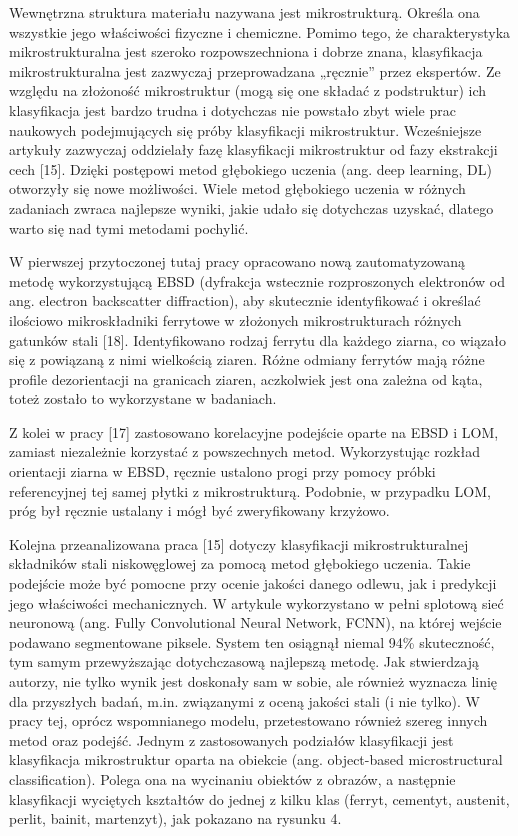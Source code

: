Wewnętrzna struktura materiału nazywana jest mikrostrukturą. Określa ona wszystkie jego właściwości fizyczne i chemiczne. Pomimo tego, że charakterystyka mikrostrukturalna jest szeroko rozpowszechniona i dobrze znana, klasyfikacja mikrostrukturalna jest zazwyczaj przeprowadzana „ręcznie” przez ekspertów. Ze względu na złożoność mikrostruktur (mogą się one składać z podstruktur) ich klasyfikacja jest bardzo trudna i dotychczas nie powstało zbyt wiele prac naukowych podejmujących się próby klasyfikacji mikrostruktur. Wcześniejsze artykuły zazwyczaj oddzielały fazę klasyfikacji mikrostruktur od fazy ekstrakcji cech [15]. Dzięki postępowi metod głębokiego uczenia (ang. deep learning, DL) otworzyły się nowe możliwości. Wiele metod głębokiego uczenia w różnych zadaniach zwraca najlepsze wyniki, jakie udało się dotychczas uzyskać, dlatego warto się nad tymi metodami pochylić. 

W pierwszej przytoczonej tutaj pracy opracowano nową zautomatyzowaną metodę wykorzystującą EBSD (dyfrakcja wstecznie rozproszonych elektronów od ang. electron backscatter diffraction), aby skutecznie identyfikować i określać ilościowo mikroskładniki ferrytowe w złożonych mikrostrukturach różnych gatunków stali [18]. Identyfikowano rodzaj ferrytu dla każdego ziarna, co wiązało się z powiązaną z nimi wielkością ziaren. Różne odmiany ferrytów mają różne profile dezorientacji na granicach ziaren, aczkolwiek jest ona zależna od kąta, toteż zostało to wykorzystane w badaniach.

Z kolei w pracy [17] zastosowano korelacyjne podejście oparte na EBSD i LOM, zamiast niezależnie korzystać z powszechnych metod. Wykorzystując rozkład orientacji ziarna w EBSD, ręcznie ustalono progi przy pomocy próbki referencyjnej tej samej płytki z mikrostrukturą. Podobnie, w przypadku LOM, próg był ręcznie ustalany i mógł być zweryfikowany krzyżowo.

Kolejna przeanalizowana praca [15] dotyczy klasyfikacji mikrostrukturalnej składników stali niskowęglowej za pomocą metod głębokiego uczenia. Takie podejście może być pomocne przy ocenie jakości danego odlewu, jak i predykcji jego właściwości mechanicznych. W artykule wykorzystano w pełni splotową sieć neuronową (ang. Fully Convolutional Neural Network, FCNN), na której wejście podawano segmentowane piksele. System ten osiągnął niemal 94\% skuteczność, tym samym przewyższając dotychczasową najlepszą metodę. Jak stwierdzają autorzy, nie tylko wynik jest doskonały sam w sobie, ale również wyznacza linię dla przyszłych badań, m.in. związanymi z oceną jakości stali (i nie tylko). W pracy tej, oprócz wspomnianego modelu, przetestowano również szereg innych metod oraz podejść. Jednym z zastosowanych podziałów klasyfikacji jest klasyfikacja mikrostruktur oparta na obiekcie (ang. object-based microstructural classification). Polega ona na wycinaniu obiektów z obrazów, a następnie klasyfikacji wyciętych kształtów do jednej z kilku klas (ferryt, cementyt, austenit, perlit, bainit, martenzyt), jak pokazano na rysunku 4.  

